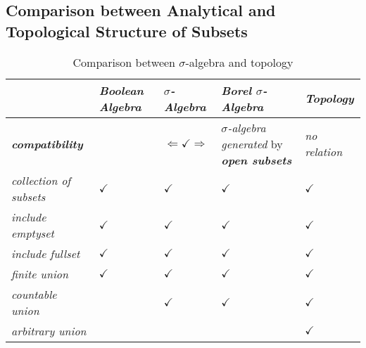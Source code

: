 \documentclass[11pt]{article}
\begin{document}
\subsection{Comparison between Analytical and Topological Structure of Subsets}
\begin{table}[h!]
\setlength{\abovedisplayskip}{0pt}
\setlength{\belowdisplayskip}{-10pt}
\setlength{\abovedisplayshortskip}{0pt}
\setlength{\belowdisplayshortskip}{0pt}
\footnotesize
\centering
\caption{Comparison between $\sigma$-algebra and topology}
\label{tab: measure}
\renewcommand\tabularxcolumn[1]{m{#1}}
\small
\begin{tabularx}{1\textwidth} { 
  | >{\raggedright\arraybackslash} m{3cm}
  | >{\centering\arraybackslash}X
  | >{\centering\arraybackslash}X
  | >{\centering\arraybackslash}X
  | >{\centering\arraybackslash}X  | }
 \hline
  &  \emph{\textbf{Boolean Algebra}} & \emph{\textbf{$\sigma$-Algebra}}   &  \emph{\textbf{Borel $\sigma$-Algebra}}   & \emph{\textbf{Topology}} \\
  \hline 
\textbf{\emph{compatibility}}    & & $\Leftarrow \checkmark \Rightarrow$  & \emph{$\sigma$-algebra generated} by \emph{\textbf{open subsets}} & \emph{no relation} \\
 \hline \vspace{5pt}
\emph{collection of subsets}  \vspace{2pt} &  $\checkmark$  & $\checkmark$  & $\checkmark$  & $\checkmark$  \\
 \hline \vspace{5pt}
\emph{include emptyset} \vspace{2pt}  &  $\checkmark$  & $\checkmark$  & $\checkmark$  & $\checkmark$  \\
\hline \vspace{5pt}
\emph{include fullset}  \vspace{2pt}  &  $\checkmark$  & $\checkmark$  & $\checkmark$  & $\checkmark$  \\
\hline \vspace{5pt}
\emph{finite union} \vspace{2pt}   & $\checkmark$  & $\checkmark$  & $\checkmark$  & $\checkmark$  \\
\hline \vspace{5pt}
\emph{countable union} \vspace{2pt}   &   & $\checkmark$  & $\checkmark$  & $\checkmark$  \\
\hline \vspace{5pt}
\emph{arbitrary union} \vspace{2pt}   &   &  &  & $\checkmark$  \\

\end{tabularx}
\end{table}
\end{document}
